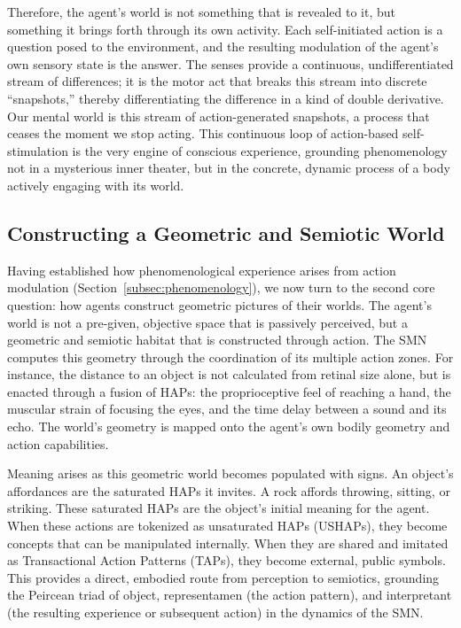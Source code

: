 Therefore, the agent's world is not something that is revealed to it, but something it brings forth through its own activity. Each self-initiated action is a question posed to the environment, and the resulting modulation of the agent's own sensory state is the answer. The senses provide a continuous, undifferentiated stream of differences; it is the motor act that breaks this stream into discrete ``snapshots,'' thereby differentiating the difference in a kind of double derivative. Our mental world is this stream of action-generated snapshots, a process that ceases the moment we stop acting. This continuous loop of action-based self-stimulation is the very engine of conscious experience, grounding phenomenology not in a mysterious inner theater, but in the concrete, dynamic process of a body actively engaging with its world.

\subsection{Constructing a Geometric and Semiotic World}
\label{subsec:semiotic_world}
Having established how phenomenological experience arises from action modulation (Section~\ref{subsec:phenomenology}), we now turn to the second core question: how agents construct geometric pictures of their worlds. The agent's world is not a pre-given, objective space that is passively perceived, but a geometric and semiotic habitat that is constructed through action. The SMN computes this geometry through the coordination of its multiple action zones. For instance, the distance to an object is not calculated from retinal size alone, but is enacted through a fusion of HAPs: the proprioceptive feel of reaching a hand, the muscular strain of focusing the eyes, and the time delay between a sound and its echo. The world's geometry is mapped onto the agent's own bodily geometry and action capabilities.

Meaning arises as this geometric world becomes populated with signs. An object's affordances are the saturated HAPs it invites. A rock affords throwing, sitting, or striking. These saturated HAPs are the object's initial meaning for the agent. When these actions are tokenized as unsaturated HAPs (USHAPs), they become concepts that can be manipulated internally. When they are shared and imitated as Transactional Action Patterns (TAPs), they become external, public symbols. This provides a direct, embodied route from perception to semiotics, grounding the Peircean triad of object, representamen (the action pattern), and interpretant (the resulting experience or subsequent action) in the dynamics of the SMN.

